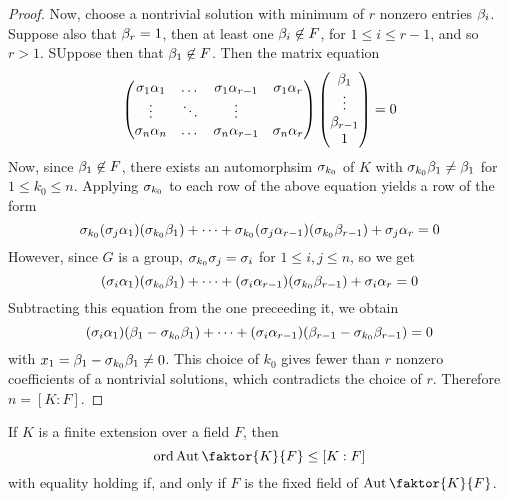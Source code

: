\begin{proof}
    Now, choose a nontrivial solution with minimum of  $r$ nonzero entries
    $\beta_i$. Suppose also that  $\beta_r=1$, then at least one  $\beta_i \not\in F$,
    for  $1 \leq i \leq r-1$, and so  $r>1$. SUppose then that  $\beta_1 \not\in
    F$. Then the matrix equation
    \begin{equation*}
        \begin{pmatrix}
            \sigma_1\alpha_1    &   \dots   &   \sigma_1\alpha_{r-1}    &   \sigma_1\alpha_r    \\
            \vdots  &   \ddots  &   \vdots  \\
            \sigma_n\alpha_n    &   \dots   &   \sigma_n\alpha_{r-1}    &   \sigma_n\alpha_r    \\
        \end{pmatrix}
        \begin{pmatrix}
            \beta_1    \\ \vdots   \\  \beta_{r-1}    \\  1   \\
        \end{pmatrix}
        =0
    \end{equation*}
    Now, since $\beta_1 \not\in F$, there exists an automorphsim $\sigma_{k_0}$ of $K$
    with  $\sigma_{k_0}\beta_1 \neq \beta_1$ for $1 \leq k_0 \leq n$. Applying $\sigma_{k_0}$
    to each row of the above equation yields a row of the form
    \begin{equation*}
        \sigma_{k_0}(\sigma_j\alpha_1)(\sigma_{k_0}\beta_1)+\dots+\sigma_{k_0}(\sigma_j\alpha_{r-1})
            (\sigma_{k_0}\beta_{r-1})+\sigma_j\alpha_r=0
    \end{equation*}
    However, since $G$ is a group,  $\sigma_{k_0}\sigma_j=\sigma_i$ for $1 \leq i,j \leq n$,
    so we get
    \begin{equation*}
        (\sigma_i\alpha_1)(\sigma_{k_0}\beta_1)+\dots+(\sigma_i\alpha_{r-1})(\sigma_{k_0}\beta_{r-1})+\sigma_i\alpha_r=0
    \end{equation*}
    Subtracting this equation from the one preceeding it, we obtain
    \begin{equation*}
        (\sigma_i\alpha_1)(\beta_1-\sigma_{k_0}\beta_1)+\dots+(\sigma_i\alpha_{r-1})(\beta_{r-1}-\sigma_{k_0}\beta_{r-1})
            =0
    \end{equation*}
    with $x_1=\beta_1-\sigma_{k_0}\beta_1 \neq 0$. This choice of $k_0$ gives fewer than
    $r$ nonzero coefficients of a nontrivial solutions, which contradicts the
    choice of  $r$. Therefore  $n=[K:F]$.
\end{proof}
\begin{corollary}
    If $K$ is a finite extension over a field  $F$, then
    \begin{equation*}
        \ord{\Aut{\faktor{K}{F}}} \leq [K:F]
    \end{equation*}
    with equality holding if, and only if $F$ is the fixed field of
    $\Aut{\faktor{K}{F}}$.
\end{corollary}
